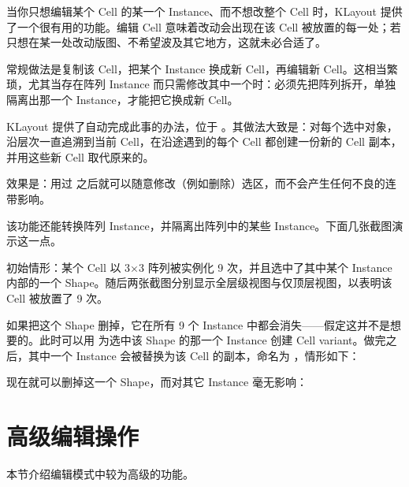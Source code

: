 当你只想编辑某个 Cell 的某一个 Instance、而不想改整个 Cell 时，KLayout 提供了一个很有用的功能。编辑 Cell 意味着改动会出现在该 Cell 被放置的每一处；若只想在某一处改动版图、不希望波及其它地方，这就未必合适了。

常规做法是复制该 Cell，把某个 Instance 换成新 Cell，再编辑新 Cell。这相当繁琐，尤其当存在阵列 Instance 而只需修改其中一个时：必须先把阵列拆开，单独隔离出那一个 Instance，才能把它换成新 Cell。

KLayout 提供了自动完成此事的办法，位于 。其做法大致是：对每个选中对象，沿层次一直追溯到当前 Cell，在沿途遇到的每个 Cell 都创建一份新的 Cell 副本，并用这些新 Cell 取代原来的。

效果是：用过  之后就可以随意修改（例如删除）选区，而不会产生任何不良的连带影响。

该功能还能转换阵列 Instance，并隔离出阵列中的某些 Instance。下面几张截图演示这一点。

初始情形：某个 Cell 以 3×3 阵列被实例化 9 次，并且选中了其中某个 Instance 内部的一个 Shape。随后两张截图分别显示全层级视图与仅顶层视图，以表明该 Cell 被放置了 9 次。


如果把这个 Shape 删掉，它在所有 9 个 Instance 中都会消失——假定这并不是想要的。此时可以用  为选中该 Shape 的那一个 Instance 创建 Cell variant。做完之后，其中一个 Instance 会被替换为该 Cell 的副本，命名为 ，情形如下：


现在就可以删掉这一个 Shape，而对其它 Instance 毫无影响：


\section{高级编辑操作}\label{sec:editor_advanced}

本节介绍编辑模式中较为高级的功能。
